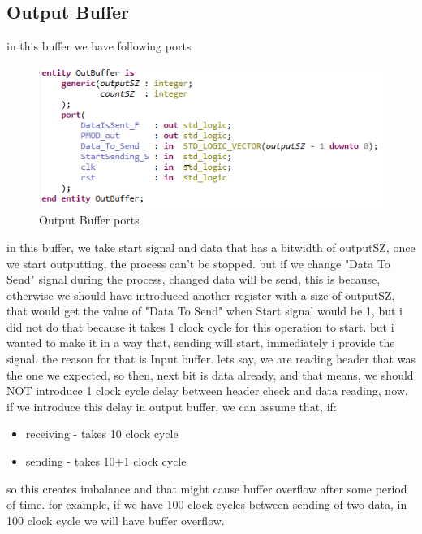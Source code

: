 \documentclass{article}
\begin{document}
\subsection{Output Buffer}

in this buffer we have following ports
\begin{figure}[H]
    \centering
    \includegraphics[scale=0.7]{OutBuffer.png}
    \caption{Output Buffer ports}
    \label{fig:OutBuffer}
\end{figure}

in this buffer, we take start signal and data that has a bitwidth of outputSZ, once we start outputting, the process can't be stopped.
but if we change "Data To Send" signal during the process, changed data will be send, this is because, otherwise we should have introduced another register with a size of outputSZ, that would get the value of "Data To Send" when Start signal would be 1, but i did not do that because it takes 1 clock cycle for this operation to start. but i wanted to make it in a way that, sending will start, immediately i provide the signal. the reason for that is Input buffer. lets say, we are reading header that was the one we expected, so then, next bit is data already, and that means, we should NOT introduce 1 clock cycle delay between header check and data reading, now, if we introduce this delay in output buffer, we can assume that, if:

\begin{itemize}
    \item receiving - takes 10 clock cycle
    \item sending - takes 10+1 clock cycle
\end{itemize}

so this creates imbalance and that might cause buffer overflow after some period of time. for example, if we have 100 clock cycles between sending of two data, in 100 clock cycle we will have buffer overflow.
\end{document}
